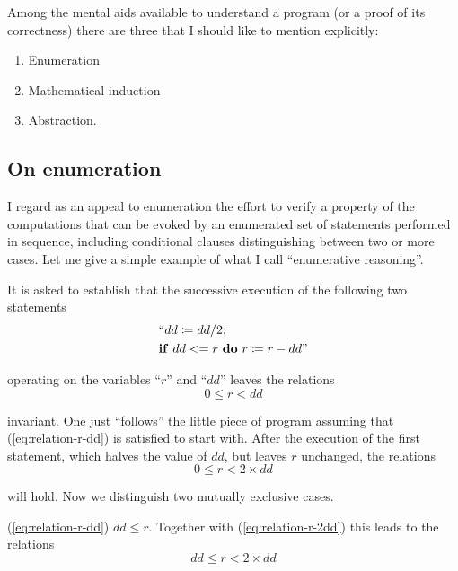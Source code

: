 Among the mental aids available to understand a program (or a proof of its correctness) there are three that I should like to mention explicitly:

\begin{enumerate}[label=(\arabic*)]
\item Enumeration
\item Mathematical induction
\item Abstraction.
\end{enumerate}

\subsection{On enumeration}
\label{subsec:enumeration}

I regard as an appeal to enumeration the effort to verify a property of the computations that can be evoked by an enumerated set of statements performed in sequence, including conditional clauses distinguishing between two or more cases. Let me give a simple example of what I call ``enumerative reasoning''.

It is asked to establish that the successive execution of the following two statements
\begin{equation*}
	\begin{split}
		&\text{``}dd \coloneq dd/2; \\
		&\text{\textbf{if} } dd <= r \text{ \textbf{do} } r \coloneq r - dd\text{''}
	\end{split}
\end{equation*}

\noindent
operating on the variables ``$r$'' and ``$dd$'' leaves the relations
\begin{equation}
	\label{eq:relation-r-dd}
	0 \leqslant r < dd
\end{equation}

\noindent
invariant. One just ``follows'' the little piece of program assuming that (\ref{eq:relation-r-dd}) is satisfied to start with. After the execution of the first statement, which halves the value of $dd$, but leaves $r$ unchanged, the relations
\begin{equation}
	\label{eq:relation-r-2dd}
	0 \leqslant r < 2\times dd
\end{equation}

\noindent
will hold. Now we distinguish two mutually exclusive cases.

(\ref{eq:relation-r-dd}) $dd \leqslant r$. Together with (\ref{eq:relation-r-2dd}) this leads to the relations
\begin{equation}
	\label{eq:relation-dd-r-2dd}
	dd \leqslant r < 2\times dd
\end{equation}

